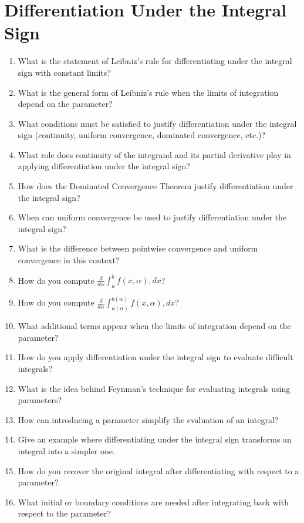 \section{Differentiation Under the Integral Sign}

\begin{enumerate}
  \item What is the statement of Leibniz's rule for differentiating under the integral sign with constant limits?
  \item What is the general form of Leibniz's rule when the limits of integration depend on the parameter?
  \item What conditions must be satisfied to justify differentiation under the integral sign (continuity, uniform convergence, dominated convergence, etc.)?
  \item What role does continuity of the integrand and its partial derivative play in applying differentiation under the integral sign?
  \item How does the Dominated Convergence Theorem justify differentiation under the integral sign?
  \item When can uniform convergence be used to justify differentiation under the integral sign?
  \item What is the difference between pointwise convergence and uniform convergence in this context?
  \item How do you compute $\frac{d}{d\alpha} \int_a^b f(x,\alpha),dx$?
  \item How do you compute $\frac{d}{d\alpha} \int_{a(\alpha)}^{b(\alpha)} f(x,\alpha),dx$?
  \item What additional terms appear when the limits of integration depend on the parameter?
  \item How do you apply differentiation under the integral sign to evaluate difficult integrals?
  \item What is the idea behind Feynman's technique for evaluating integrals using parameters?
  \item How can introducing a parameter simplify the evaluation of an integral?
  \item Give an example where differentiating under the integral sign transforms an integral into a simpler one.
  \item How do you recover the original integral after differentiating with respect to a parameter?
  \item What initial or boundary conditions are needed after integrating back with respect to the parameter?

\end{enumerate}
